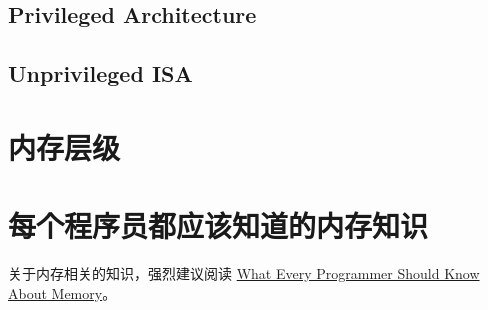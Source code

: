 \subsection{Privileged Architecture}

\subsection{Unprivileged ISA}

\section{内存层级}

\section{每个程序员都应该知道的内存知识}

关于内存相关的知识，强烈建议阅读
\href{https://people.freebsd.org/~lstewart/articles/cpumemory.pdf}{What Every Programmer Should Know About Memory}。


